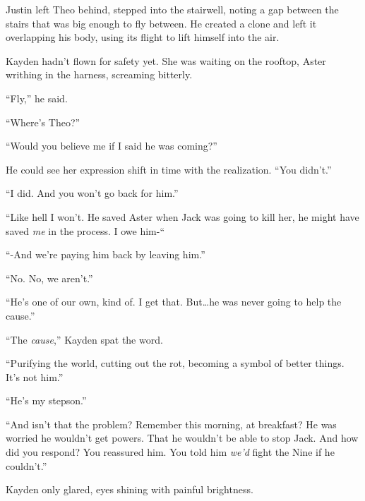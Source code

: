 Justin left Theo behind, stepped into the stairwell, noting a gap between the stairs that was big enough to fly between.  He created a clone and left it overlapping his body, using its flight to lift himself into the air.



Kayden hadn't flown for safety yet.  She was waiting on the rooftop, Aster writhing in the harness, screaming bitterly.



``Fly,'' he said.



``Where's Theo?''



``Would you believe me if I said he was coming?''



He could see her expression shift in time with the realization.  ``You didn't.''



``I did.  And you won't go back for him.''



``Like hell I won't.  He saved Aster when Jack was going to kill her, he might have saved \emph{me} in the process.  I owe him-``



``-And we're paying him back by leaving him.''



``No.  No, we aren't.''



``He's one of our own, kind of.  I get that.  But\ldots he was never going to help the cause.''



``The \emph{cause},'' Kayden spat the word.



``Purifying the world, cutting out the rot, becoming a symbol of better things.  It's not him.''



``He's my stepson.''



``And isn't that the problem?  Remember this morning, at breakfast?  He was worried he wouldn't get powers.  That he wouldn't be able to stop Jack.  And how did you respond?  You reassured him.  You told him \emph{we'd} fight the Nine if he couldn't.''



Kayden only glared, eyes shining with painful brightness.



